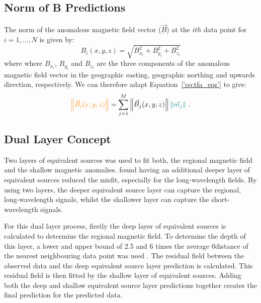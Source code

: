 \subsection{Norm of B Predictions}
The norm of the anomalous magnetic field vector ($\vec{B}$) at the $ith$ data point for $i = 1,...,N$ is given by:
\begin{equation}
    B_i(x,y,z) = \sqrt{B^2_{x_i} + B^2_{y_i} +B^2_{z_i}}
\end{equation}
where where $B_{x_i}$, $B_{y_i}$ and $B_{z_i}$ are the three components of the anomalous magnetic field vector in the geographic easting, geographic northing and upwards direction, respectively. We can therefore adapt Equation~\ref{'eq:tfa_eqs'} to give:
\begin{equation}
\textcolor{orange}{\left\lVert \vec{B}_{i}(x,y,z) \right\rVert} = \sum_{j=1}^{M}  \left\lVert \vec{B}_{j}(x,y,z) \right\rVert \textcolor{teal}{\left\lVert \vec{m_j} \right\rVert}
\ .
\end{equation}


\subsection{Dual Layer Concept}
Two layers of equivalent sources was used to fit both, the regional magnetic field and the shallow magnetic anomalies. \citep{Li2019} found having an additional deeper layer of equivalent sources reduced the misfit, especially for the long‐wavelength fields. By using two layers, the deeper equivalent source layer can capture the regional, long-wavelength signals, whilst the shallower layer can capture the short-wavelength signals.

For this dual layer process, firstly the deep layer of equivalent sources is calculated to determine the regional magnetic field. To determine the depth of this layer, a lower and upper bound of 2.5 and 6 times the average 0distance of the nearest neighbouring data point was used \citep{Dampney1969}. The residual field between the observed data and the deep equivalent source layer prediction is calculated. This residual field is then fitted by the shallow layer of equivalent sources. Adding both the deep and shallow equivalent source layer predictions together creates the final prediction for the predicted data.

